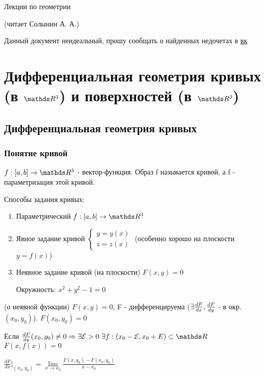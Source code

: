 \documentclass[11pt]{article}
\begin{document}
\begin{center}
  \huge Лекции по геометрии
  
  (читает Солынин А. А.)
\end{center}
Данный документ неидеальный, прошу сообщать о найденных недочетах в \href{https://vk.com/drab_existence_a}{вк}
\tableofcontents
\newpage

\section{Дифференциальная геометрия кривых (в $\R^3$) и поверхностей (в $\R^3$)}
\subsection{Дифференциальная геометрия кривых}
\subsubsection{Понятие кривой}

\begin{definition}
    $f:[a,b] \rightarrow \R^3$ - вектор-функция. Образ f называется кривой, а f - параметризация этой кривой.
\end{definition}

Способы задания кривых:
\begin{enumerate}
    \item Параметрический $f:[a,b] \rightarrow \R^3$
    \item Явное задание кривой $\begin{cases} y=y(x)\\ z=z(x)
    \end{cases}$ (особенно хорошо на плоскости $y=f(x)$)
    \item Неявное задание кривой (на плоскости) $F(x,y)=0$
    \begin{instance}
        Окружность: $x^2+y^2-1=0$
    \end{instance}
\end{enumerate}

\begin{theorem2}{(о неявной функции)}
$F(x,y)=0$, F - дифференцируема ($\exists \frac{dF}{dx}, \frac{dF}{dy}$ - в окр. $(x_0,y_0)$). $F(x_0,y_0)=0$

Если $\frac{dF}{dy}(x_0,y_0) \neq 0 \ra \e \E>0\ \e f: (x_0-\E,x_0+E) \subset \R$ $F(x, f(x))=0$
\end{theorem2}

\begin{reminder}{}
    $\frac{dF}{dx}|_{(x_0,y_0)}=\lim\limits_{x \rightarrow x_0} \frac{F(x,y_0)-F(x_0,y_0)}{x-x_0}$
\end{reminder}
\end{document}
